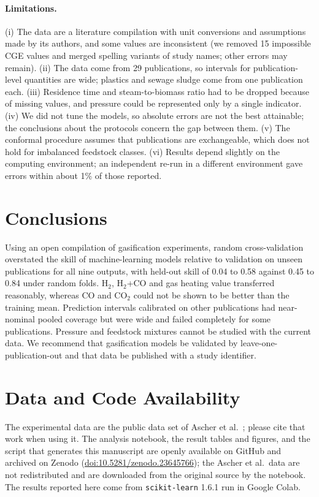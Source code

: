 \documentclass[11pt,a4paper]{article}
\begin{document}
\paragraph{Limitations.}
(i) The data are a literature compilation with unit conversions and assumptions made by its authors, and some values are inconsistent (we removed 15 impossible CGE values and merged spelling variants of study names; other errors may remain). (ii) The data come from 29 publications, so intervals for publication-level quantities are wide; plastics and sewage sludge come from one publication each. (iii) Residence time and steam-to-biomass ratio had to be dropped because of missing values, and pressure could be represented only by a single indicator. (iv) We did not tune the models, so absolute errors are not the best attainable; the conclusions about the protocols concern the gap between them. (v) The conformal procedure assumes that publications are exchangeable, which does not hold for imbalanced feedstock classes. (vi) Results depend slightly on the computing environment; an independent re-run in a different environment gave errors within about 1\% of those reported.

\section{Conclusions}
Using an open compilation of gasification experiments, random cross-validation overstated the skill of machine-learning models relative to validation on unseen publications for all nine outputs, with held-out skill of 0.04 to 0.58 against 0.45 to 0.84 under random folds. H$_2$, H$_2$+CO and gas heating value transferred reasonably, whereas CO and CO$_2$ could not be shown to be better than the training mean. Prediction intervals calibrated on other publications had near-nominal pooled coverage but were wide and failed completely for some publications. Pressure and feedstock mixtures cannot be studied with the current data. We recommend that gasification models be validated by leave-one-publication-out and that data be published with a study identifier.

\section*{Data and Code Availability}
The experimental data are the public data set of Ascher et al.\ \cite{Ascher2022}; please cite that work when using it. The analysis notebook, the result tables and figures, and the script that generates this manuscript are openly available on GitHub and archived on Zenodo (\href{https://doi.org/10.5281/zenodo.23645766}{doi:10.5281/zenodo.23645766}); the Ascher et al.\ data are not redistributed and are downloaded from the original source by the notebook. The results reported here come from \texttt{scikit-learn} 1.6.1 run in Google Colab.
\end{document}
